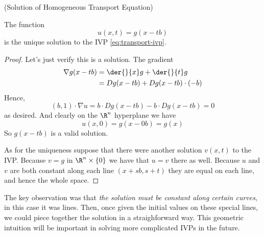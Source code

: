 \documentclass{bkcnotes}
\begin{document}
\begin{nthm}(Solution of Homogeneous Transport Equation)

  The function
  \begin{equation}
    \label{eq:transport-sol}
    u(x,t) = g(x-tb)
  \end{equation}
  is the unique solution to the IVP \eqref{eq:transport-ivp}.
\end{nthm}
\begin{proof}
  Let's just verify this is a solution. The gradient
  \begin{equation}
    \label{eq:grad-sol}
    \begin{aligned}
      \nabla g(x-tb) &= \der{}{x}g + \der{}{t}g \\
      &= Dg(x-tb) + Dg(x-tb)\cdot(-b)
    \end{aligned}
  \end{equation}
  Hence,
  \begin{equation}
    (b,1) \cdot \nabla u = b \cdot Dg(x-tb) - b\cdot Dg(x-tb) = 0
  \end{equation}
  as desired. And clearly on the $\R^n$ hyperplane we have
  \begin{equation}
    u(x,0) = g(x - 0b) = g(x)
  \end{equation}
  So $g(x-tb)$ is a valid solution.

  As for the uniqueness suppose that there were another solution
  $v(x,t)$ to the IVP. Because $v = g$ in $\R^n \times \{0\}$ we have
  that $u=v$ there as well. Because $u$ and $v$ are both constant
  along each line $(x+sb,s+t)$ they are equal on each line, and hence
  the whole space.
\end{proof}

The key observation was that \emph{the solution must be constant along
  certain curves}, in this case it was lines. Then, once given the
initial values on these special lines, we could piece together the
solution in a straighforward way. This geometric intuition will be
important in solving more complicated IVPs in the future.
\end{document}
